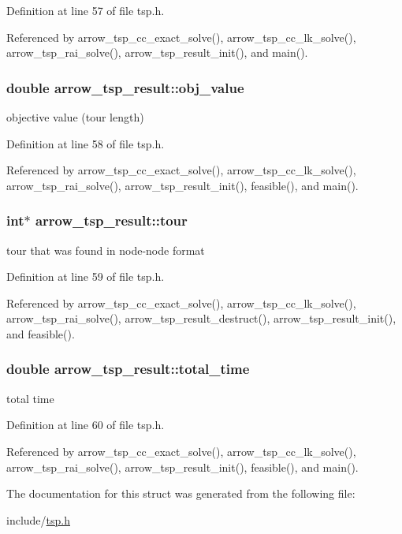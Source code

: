 Definition at line 57 of file tsp.h.

Referenced by arrow\_\-tsp\_\-cc\_\-exact\_\-solve(), arrow\_\-tsp\_\-cc\_\-lk\_\-solve(), arrow\_\-tsp\_\-rai\_\-solve(), arrow\_\-tsp\_\-result\_\-init(), and main().\hypertarget{structarrow__tsp__result_f0fae9756e4c924517addf05988cfcb9}{
\subsubsection{\setlength{\rightskip}{0pt plus 5cm}double {\bf arrow\_\-tsp\_\-result::obj\_\-value}}}
\label{structarrow__tsp__result_f0fae9756e4c924517addf05988cfcb9}


objective value (tour length) 

Definition at line 58 of file tsp.h.

Referenced by arrow\_\-tsp\_\-cc\_\-exact\_\-solve(), arrow\_\-tsp\_\-cc\_\-lk\_\-solve(), arrow\_\-tsp\_\-rai\_\-solve(), arrow\_\-tsp\_\-result\_\-init(), feasible(), and main().\hypertarget{structarrow__tsp__result_48433b03146d6ca3423a555ea2139d52}{
\subsubsection{\setlength{\rightskip}{0pt plus 5cm}int$\ast$ {\bf arrow\_\-tsp\_\-result::tour}}}
\label{structarrow__tsp__result_48433b03146d6ca3423a555ea2139d52}


tour that was found in node-node format 

Definition at line 59 of file tsp.h.

Referenced by arrow\_\-tsp\_\-cc\_\-exact\_\-solve(), arrow\_\-tsp\_\-cc\_\-lk\_\-solve(), arrow\_\-tsp\_\-rai\_\-solve(), arrow\_\-tsp\_\-result\_\-destruct(), arrow\_\-tsp\_\-result\_\-init(), and feasible().\hypertarget{structarrow__tsp__result_82ea7aa0320d932892602d34339a9276}{
\subsubsection{\setlength{\rightskip}{0pt plus 5cm}double {\bf arrow\_\-tsp\_\-result::total\_\-time}}}
\label{structarrow__tsp__result_82ea7aa0320d932892602d34339a9276}


total time 

Definition at line 60 of file tsp.h.

Referenced by arrow\_\-tsp\_\-cc\_\-exact\_\-solve(), arrow\_\-tsp\_\-cc\_\-lk\_\-solve(), arrow\_\-tsp\_\-rai\_\-solve(), arrow\_\-tsp\_\-result\_\-init(), feasible(), and main().

The documentation for this struct was generated from the following file:\begin{CompactItemize}
\item 
include/\hyperlink{tsp_8h}{tsp.h}\end{CompactItemize}
